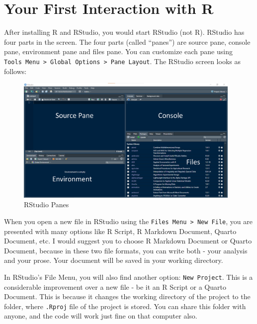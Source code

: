 \documentclass[
  letterpaper,
  paper =a4,
  twoside,
  openright,
  headsepline,
  footsepline,
  listof = totocnumbered,
  chapterprefix = true,
  firstiscover]{scrbook}
\begin{document}
\hypertarget{your-first-interaction-with-r}{%
\section{Your First Interaction with
R}\label{your-first-interaction-with-r}}

After installing R and RStudio, you would start RStudio (not R). RStudio
has four parts in the screen. The four parts (called ``panes'') are
source pane, console pane, environment pane and files pane. You can
customize each pane using
\texttt{Tools\ Menu\ \textgreater{}\ Global\ Options\ \textgreater{}\ Pane\ Layout}.
The RStudio screen looks as follows:

\begin{figure}

{\centering \includegraphics[width=4.27in,height=\textheight]{images/RStudio-panes.png}

}

\caption{\label{fig-rstudio-panes}RStudio Panes}

\end{figure}

When you open a new file in RStudio using the
\texttt{Files\ Menu\ \textgreater{}\ New\ File}, you are presented with
many options like R Script, R Markdown Document, Quarto Document, etc. I
would suggest you to choose R Markdown Document or Quarto Document,
because in these two file formats, you can write both - your analysis
and your prose. Your document will be saved in your working directory.

In RStudio's File Menu, you will also find another option:
\texttt{New\ Project}. This is a considerable improvement over a new
file - be it an R Script or a Quarto Document. This is because it
changes the working directory of the project to the folder, where
\texttt{.Rproj} file of the project is stored. You can share this folder
with anyone, and the code will work just fine on that computer also.
\end{document}

